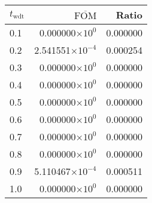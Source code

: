 \begin{tabular}{lrr}
\toprule
$t_{\mathrm{wdt}}$ & $\overline{\mathrm{FOM}}$ &    Ratio \\
\midrule
               0.1 &   0.000000$\times 10^{0}$ & 0.000000 \\
               0.2 &  2.541551$\times 10^{-4}$ & 0.000254 \\
               0.3 &   0.000000$\times 10^{0}$ & 0.000000 \\
               0.4 &   0.000000$\times 10^{0}$ & 0.000000 \\
               0.5 &   0.000000$\times 10^{0}$ & 0.000000 \\
               0.6 &   0.000000$\times 10^{0}$ & 0.000000 \\
               0.7 &   0.000000$\times 10^{0}$ & 0.000000 \\
               0.8 &   0.000000$\times 10^{0}$ & 0.000000 \\
               0.9 &  5.110467$\times 10^{-4}$ & 0.000511 \\
               1.0 &   0.000000$\times 10^{0}$ & 0.000000 \\
\bottomrule
\end{tabular}
